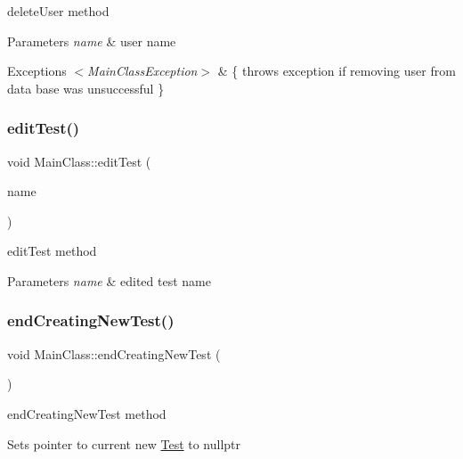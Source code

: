 delete\+User method 


\begin{DoxyParams}{Parameters}
{\em name} & user name \\
\hline
\end{DoxyParams}

\begin{DoxyExceptions}{Exceptions}
{\em $<$\+Main\+Class\+Exception$>$} & \{ throws exception if removing user from data base was unsuccessful \} \\
\hline
\end{DoxyExceptions}
\mbox{\label{class_main_class_aca1ce710f27a6abdda8310799a750f78}} 
\subsubsection{\texorpdfstring{edit\+Test()}{editTest()}}
{\footnotesize\ttfamily void Main\+Class\+::edit\+Test (\begin{DoxyParamCaption}\item[{const Q\+String \&}]{name }\end{DoxyParamCaption})}



edit\+Test method 


\begin{DoxyParams}{Parameters}
{\em name} & edited test name \\
\hline
\end{DoxyParams}
\mbox{\label{class_main_class_a6f4b8eaa3ac3e2bfd2665fed96a33775}} 
\subsubsection{\texorpdfstring{end\+Creating\+New\+Test()}{endCreatingNewTest()}}
{\footnotesize\ttfamily void Main\+Class\+::end\+Creating\+New\+Test (\begin{DoxyParamCaption}{ }\end{DoxyParamCaption})}



end\+Creating\+New\+Test method 

Sets pointer to current new \hyperlink{class_test}{Test} to nullptr \mbox{\label{class_main_class_ae738e2248a895b7248d40188bb3f1e96}} 
